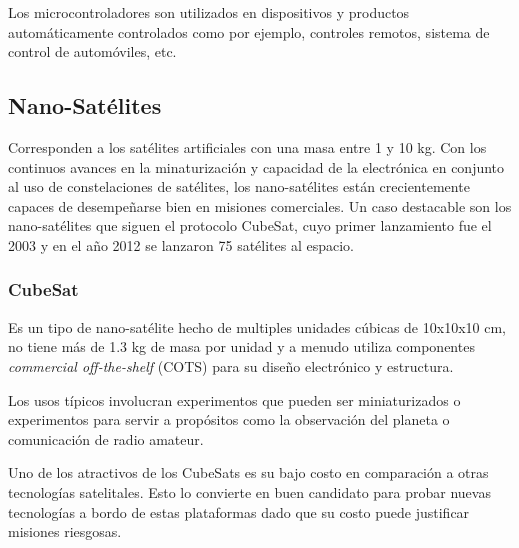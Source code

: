 Los microcontroladores son utilizados en dispositivos y productos automáticamente controlados como por ejemplo, controles remotos, sistema de control de automóviles, etc.

\subsection{Nano-Sat\'elites}
Corresponden a los sat\'elites artificiales con una masa entre 1 y 10 kg. Con los continuos avances en la minaturización y capacidad de la electrónica en conjunto al uso de constelaciones de sat\'elites, los nano-sat\'elites están crecientemente capaces de desempeñarse bien en misiones comerciales. Un caso destacable son los nano-sat\'elites que siguen el protocolo CubeSat, cuyo primer lanzamiento fue el 2003 y en el año 2012 se lanzaron 75 sat\'elites al espacio.

\subsubsection{CubeSat}
Es un tipo de nano-sat\'elite hecho de multiples unidades cúbicas de 10x10x10 cm, no tiene más de 1.3 kg de masa por unidad y a menudo utiliza componentes \textit{commercial off-the-shelf} (COTS) para su diseño electrónico y estructura.

Los usos típicos involucran experimentos que pueden ser miniaturizados o experimentos para servir a propósitos como la observación del planeta o comunicación de radio amateur.

Uno de los atractivos de los CubeSats es su bajo costo en comparación a otras tecnologías satelitales. Esto lo convierte en buen candidato para probar nuevas tecnologías a bordo de estas plataformas dado que su costo puede justificar misiones riesgosas.

